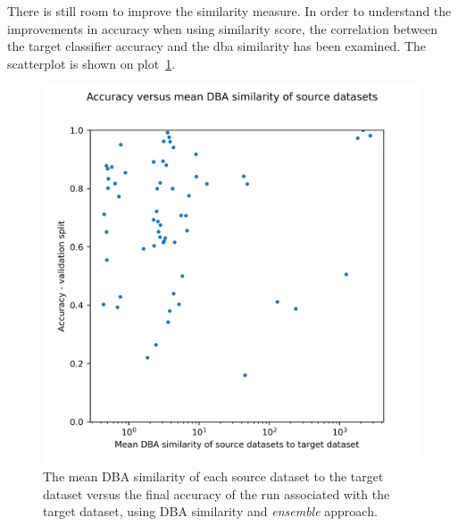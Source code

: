 \documentclass[a4paper,11pt,twoside]{report}
\theoremstyle{definition}
\begin{document}
\FloatBarrier
There is still room to improve the similarity measure. In order to understand the improvements in accuracy when using similarity score, the correlation between the target classifier accuracy and the dba similarity has been examined. The scatterplot is shown on plot~\ref{fig:acc_vs_dba_sim}.
\FloatBarrier
\begin{figure}[h!t]
\centering
\includegraphics[width=17cm]{imgs/ensemble/accuracy_vs_mean_dba_sim.png}
\caption{The mean DBA similarity of each source dataset to the target dataset versus the final accuracy of the run associated with the target dataset, using DBA similarity and \textit{ensemble} approach.}
\label{fig:acc_vs_dba_sim}
\end{figure}
\FloatBarrier
\end{document}
